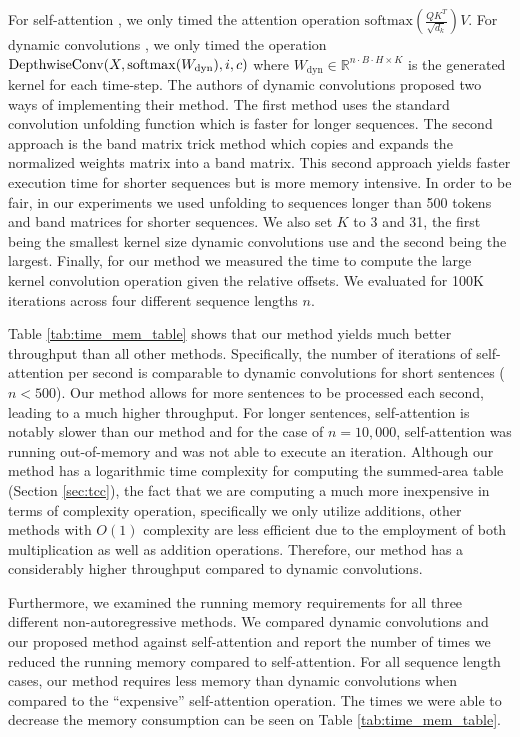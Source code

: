 \documentclass{article}
\begin{document}
For self-attention \cite{vaswani2017attention}, we only timed the attention operation $\mathrm{softmax}(\frac{QK^T}{\sqrt{d_k}})V$. For dynamic convolutions \cite{wu2019pay}, we only timed the operation $\text{DepthwiseConv}(X, \mathrm{softmax}({W}_\text{dyn}), i, c)$ where $W_\text{dyn} \in \mathbb{R}^{n{\cdot}B{\cdot}H{\times}K}$ is the generated kernel for each time-step. The authors of dynamic convolutions proposed two ways of implementing their method. The first method uses the standard convolution unfolding function which is faster for longer sequences. The second approach is the band matrix trick method which copies and expands the normalized weights matrix into a band matrix. This second approach yields faster execution time for shorter sequences but is more memory intensive. In order to be fair, in our experiments we used unfolding to sequences longer than 500 tokens and band matrices for shorter sequences. We also set $K$ to 3 and 31, the first being the smallest kernel size dynamic convolutions use and the second being the largest. Finally, for our method we measured the time to compute the large kernel convolution operation given the relative offsets. 
We evaluated for 100K iterations across four different sequence lengths $n$.

Table \ref{tab:time_mem_table} shows that our method yields much better throughput than all other methods. Specifically, the number of iterations of self-attention per second is comparable to dynamic convolutions for short sentences ($n<500$). Our method allows for more sentences to be processed each second, leading to a much higher throughput. For longer sentences, self-attention is notably slower than our method and for the case of $n=10,000$, self-attention was running out-of-memory and was not able to execute an iteration. Although our method has a logarithmic time complexity for computing the summed-area table (Section \ref{sec:tcc}), the fact that we are computing a much more inexpensive in terms of complexity operation, specifically we only utilize additions, other methods with $O(1)$ complexity are less efficient due to the employment of both multiplication as well as addition operations. Therefore, our method has a considerably higher throughput compared to dynamic convolutions. 

Furthermore, we examined the running memory requirements for all three different non-autoregressive methods. We compared dynamic convolutions and our proposed method against self-attention and report the number of times we reduced the running memory compared to self-attention. For all sequence length cases, our method requires less memory than dynamic convolutions when compared to the ``expensive'' self-attention operation. The times we were able to decrease the memory consumption can be seen on Table \ref{tab:time_mem_table}.
\end{document}
